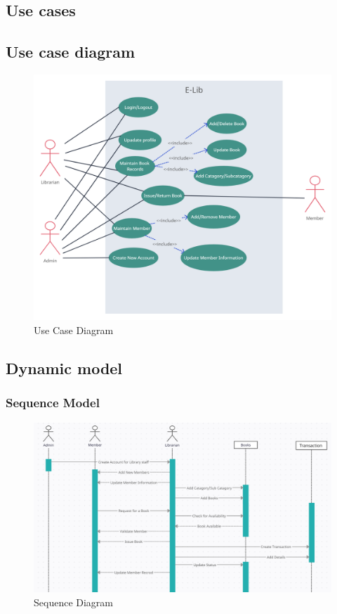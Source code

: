 \subsection{Use cases}


\subsection{Use case diagram}
\begin{figure}[H]
    \centering
    \includegraphics[scale = 0.27]{images/useCase.png}
    \caption{Use Case Diagram}
    \label{fig:use_case_diagram}
\end{figure}

\subsection{Dynamic model}
\subsubsection{Sequence Model}
\begin{figure}[H]
    \centering
    \includegraphics[width=\textwidth]{images/sequence.png}
    \caption{Sequence Diagram}
    \label{fig:sequence_diagram}
\end{figure}

